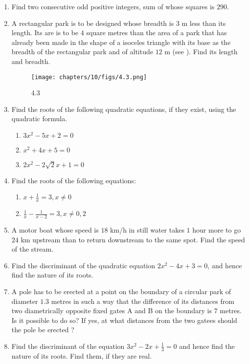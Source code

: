 \begin{enumerate}
\begin{enumerate}[label=(\roman*)]
\end{enumerate}
\item Find two consecutive odd positive integers, sum of whose squares is $290$.
\item A rectangular park is to be designed whose breadth is $3$ m less than its length. Its are is to be $4$ square metres than the area of a park that has already been made in the shape of a isoceles triangle with its base as  the breadth of the rectangular park and of altitude $12$ m (see ). Find its length and breadth.
\begin{figure}[h]
\centering
\texttt{[image: chapters/10/figs/4.3.png]}
\caption{4.3}
  \label{fig:4.3}
\end{figure}
\item Find the roots of the following quadratic equations, if they exist, using the quadratic formula.
\begin{enumerate}[label=(\roman*)]
\item $3x^2-5x+2 = 0$
\item $x^2+4x+5 = 0$
\item $2x^2-2\sqrt 2x+1 = 0$
\end{enumerate}
\item Find the roots of the following equations:
\begin{enumerate}[label=(\roman*)]
\item $x+\frac{1}{x} = 3,x\neq0$
\item $\frac{1}{x}-\frac{1}{x-2} = 3, x\neq 0,2$
\end{enumerate}
\item A motor boat whose speed is $18$ km/h in still water takes $1$ hour more to go $24$ km upstream than to return downstream to the same spot. Find the speed of the stream.
\item Find the discriminant of the quadratic equation $2x^2-4x+3 = 0$, and hence find the nature of its roots.
\item A pole has to be erected at a point on the boundary of a circular park of diameter $1.3$ metres in such a way that the difference of its distances from two diametrically opposite fixed gates A and B on the boundary is $7$ metres. Is it possible to do so? If yes, at what distances from the two gatees should the pole be erected ?
\item Find the discriminant of the equation $3x^2-2x+\frac{1}{3} = 0$ and hence find the nature of its roots. Find them, if they are real.
\end{enumerate}
